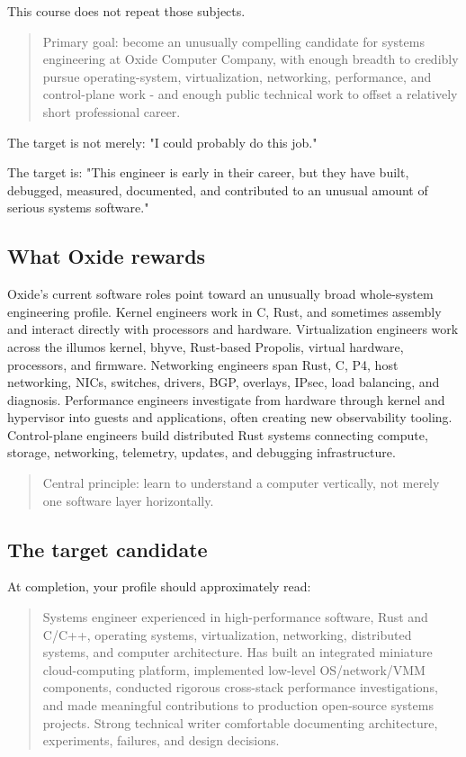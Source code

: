 \documentclass[11pt,letterpaper]{article}
\begin{document}
This course does not repeat those subjects.

\begin{quote}
Primary goal: become an unusually compelling candidate for systems engineering at Oxide Computer Company, with enough breadth to credibly pursue operating-system, virtualization, networking, performance, and control-plane work - and enough public technical work to offset a relatively short professional career.
\end{quote}

The target is not merely: "I could probably do this job."

The target is: "This engineer is early in their career, but they have built, debugged, measured, documented, and contributed to an unusual amount of serious systems software."

\subsection*{What Oxide rewards}

Oxide's current software roles point toward an unusually broad whole-system engineering profile. Kernel engineers work in C, Rust, and sometimes assembly and interact directly with processors and hardware. Virtualization engineers work across the illumos kernel, bhyve, Rust-based Propolis, virtual hardware, processors, and firmware. Networking engineers span Rust, C, P4, host networking, NICs, switches, drivers, BGP, overlays, IPsec, load balancing, and diagnosis. Performance engineers investigate from hardware through kernel and hypervisor into guests and applications, often creating new observability tooling. Control-plane engineers build distributed Rust systems connecting compute, storage, networking, telemetry, updates, and debugging infrastructure.

\begin{quote}
Central principle: learn to understand a computer vertically, not merely one software layer horizontally.
\end{quote}

\subsection*{The target candidate}

At completion, your profile should approximately read:

\begin{quote}
Systems engineer experienced in high-performance software, Rust and C/C++, operating systems, virtualization, networking, distributed systems, and computer architecture. Has built an integrated miniature cloud-computing platform, implemented low-level OS/network/VMM components, conducted rigorous cross-stack performance investigations, and made meaningful contributions to production open-source systems projects. Strong technical writer comfortable documenting architecture, experiments, failures, and design decisions.
\end{quote}
\end{document}
